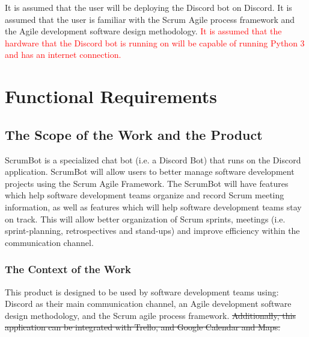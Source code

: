 \documentclass[12pt, titlepage]{article}
\begin{document}
It is assumed that the user will be deploying the Discord bot on Discord. It is assumed that the user is familiar with the Scrum Agile process framework and the Agile development software design methodology. \textcolor{red}{It is assumed that the hardware that the Discord bot is running on will be capable of running Python 3 and has an internet connection.}

\section{Functional Requirements}

\subsection{The Scope of the Work and the Product}
ScrumBot is a specialized chat bot (i.e. a Discord Bot) that runs on the Discord application. ScrumBot will allow users to better manage software development projects using the Scrum Agile Framework. The ScrumBot will have features which help software development teams organize and record Scrum meeting information, as well as features which will help software development teams stay on track. This will allow better organization of Scrum sprints, meetings  (i.e. sprint-planning, retrospectives  and  stand-ups) and  improve  efficiency  within  the communication channel.

\subsubsection{The Context of the Work}
This product is designed to be used by software development teams using: Discord as their main communication channel, an Agile development software design methodology, and the Scrum agile process framework. \sout{Additionally, this application can be integrated with Trello, and Google Calendar and Maps.}
\end{document}
